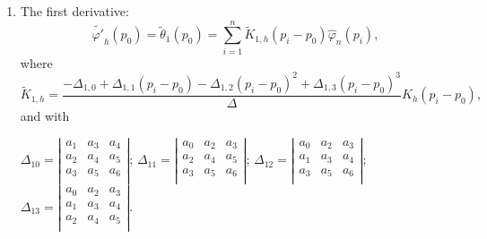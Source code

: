 \documentclass[preprint,12pt]{elsarticle}
\begin{document}
\begin{enumerate}
 

\item The first derivative: %
\begin{equation}\label{dphi.cub}
\widetilde{\varphi'}_h(p_0)=\widetilde{\theta}_1(p_0)= \sum_{i=1}^n \widetilde{K}_{1,h}\left(p_i-p_0\right) \widehat{\varphi}_n\left(p_i\right),
\end{equation}
where
\[
\widetilde{K}_{1,h}=\frac{-\Delta_{1,0}+\Delta_{1,1}\left(p_i-p_0 \right)-\Delta_{1,2}\left(p_i-p_0 \right)^2+\Delta_{1,3}\left(p_i-p_0 \right)^3}{\Delta}  K_h\left(p_i-p_0\right),
\]
and with 
\begin{center}
$
\Delta_{10}=\left|\begin{array}{ccc}
a_1 & a_3 &a_4 \\ 
a_{2} & a_4 &a_{5}\\
 a_3 &a_5 &a_6 \\ 
\end{array}\right| $; $\Delta_{11}=\left|\begin{array}{ccc}
a_0 & a_2 &a_3 \\ 
a_{2} & a_4 &a_{5}\\
 a_3 &a_5 &a_6 \\ 
\end{array}\right|$; $\Delta_{12}=\left|\begin{array}{ccc}
a_0 & a_2 &a_3 \\ 
a_{1} & a_3 &a_{4}\\
 a_3 &a_5 &a_6 \\ 
\end{array}\right|$; $\Delta_{13}=\left|\begin{array}{ccc}
a_0 & a_2 &a_3 \\ 
a_{1} & a_3 &a_{4}\\
 a_2 &a_4 &a_5 \\ 
\end{array}\right|$.
\end{center}



\end{enumerate}
\end{document}
